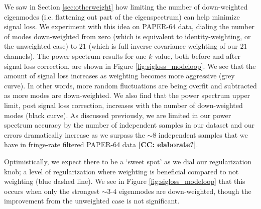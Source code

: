\documentclass[preprint2,numberedappendix,tighten]{aastex6}  %
\newcommand{\cc}[1]{{\color{purple} \textbf{[CC: #1]}}}
\begin{document}
We saw in Section \ref{sec:otherweight} how limiting the number of down-weighted eigenmodes (i.e. flattening out part of the eigenspectrum) can help minimize signal loss. We experiment with this idea on PAPER-64 data, dialing the number of modes down-weighted from zero (which is equivalent to identity-weighting, or the unweighted case) to $21$ (which is full inverse covariance weighting of our $21$ channels). The power spectrum results for one $k$ value, both before and after signal loss correction, are shown in Figure \ref{fig:sigloss_modeloop}. We see that the amount of signal loss increases as weighting becomes more aggressive (grey curve). In other words, more random fluctuations are being overfit and subtracted as more modes are down-weighted. We also find that the power spectrum upper limit, post signal loss correction, increases with the number of down-weighted modes (black curve). As discussed previously, we are limited in our power spectrum accuracy by the number of independent samples in our dataset and our errors dramatically increase as we surpass the $\sim8$ independent samples that we have in fringe-rate filtered PAPER-64 data \cc{elaborate?}.

Optimistically, we expect there to be a `sweet spot' as we dial our regularization knob; a level of regularization where weighting is beneficial compared to not weighting (blue dashed line). We see in Figure \ref{fig:sigloss_modeloop} that this occurs when only the strongest $\sim3$-$4$ eigenmodes are down-weighted, though the improvement from the unweighted case is not significant. 
\end{document}

